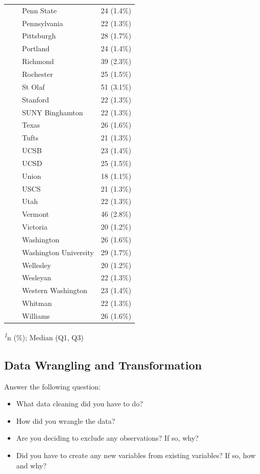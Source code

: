 \documentclass[
  letterpaper,
  DIV=11,
  numbers=noendperiod]{scrartcl}
\providecommand{\tightlist}{%
  \setlength{\itemsep}{0pt}\setlength{\parskip}{0pt}}\usepackage{longtable,booktabs,array}
\begin{document}
\begin{table}
\begin{tabular*}{\linewidth}{@{\extracolsep{\fill}}lc}
    Penn State & 24 (1.4\%) \\ 
    Pennsylvania & 22 (1.3\%) \\ 
    Pittsburgh & 28 (1.7\%) \\ 
    Portland & 24 (1.4\%) \\ 
    Richmond & 39 (2.3\%) \\ 
    Rochester & 25 (1.5\%) \\ 
    St Olaf & 51 (3.1\%) \\ 
    Stanford & 22 (1.3\%) \\ 
    SUNY Binghamton & 22 (1.3\%) \\ 
    Texas & 26 (1.6\%) \\ 
    Tufts & 21 (1.3\%) \\ 
    UCSB & 23 (1.4\%) \\ 
    UCSD & 25 (1.5\%) \\ 
    Union & 18 (1.1\%) \\ 
    USCS & 21 (1.3\%) \\ 
    Utah & 22 (1.3\%) \\ 
    Vermont & 46 (2.8\%) \\ 
    Victoria & 20 (1.2\%) \\ 
    Washington & 26 (1.6\%) \\ 
    Washington University & 29 (1.7\%) \\ 
    Wellesley & 20 (1.2\%) \\ 
    Wesleyan & 22 (1.3\%) \\ 
    Western Washington & 23 (1.4\%) \\ 
    Whitman & 22 (1.3\%) \\ 
    Williams & 26 (1.6\%) \\ 
\bottomrule
\end{tabular*}
\begin{minipage}{\linewidth}
\textsuperscript{\textit{1}}n (\%); Median (Q1, Q3)\\
\end{minipage}
\end{table}

\subsection{Data Wrangling and
Transformation}\label{data-wrangling-and-transformation}

Answer the following question:

\begin{itemize}
\tightlist
\item
  What data cleaning did you have to do?
\item
  How did you wrangle the data?
\item
  Are you deciding to exclude any observations? If so, why?
\item
  Did you have to create any new variables from existing variables? If
  so, how and why?
\end{itemize}
\end{document}
